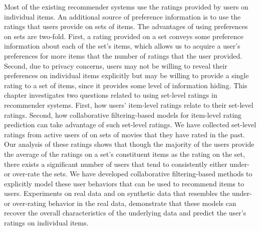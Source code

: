 Most of the existing recommender systems use the ratings provided by users on
individual items.
An additional source of preference information is to use the ratings that users provide on sets of items.
The advantages of using preferences on sets are two-fold. First, a
rating provided on a set conveys some preference information about each of the
set's items, which allows us to acquire a user's preferences for more items that
the number of ratings that the user provided.
Second, due to
privacy concerns, users may not be willing to reveal their preferences on
individual items explicitly but may be willing to provide a single rating to a
set of items, since it provides some level of information hiding. This chapter
investigates two questions related to using set-level ratings in
recommender systems. First, how users' item-level ratings relate to their
set-level ratings. Second, how collaborative filtering-based models for
item-level rating prediction can take advantage of such set-level ratings. 
We have collected set-level ratings from active users of \ML
on sets of movies that they have rated in the past. 
Our analysis of these ratings shows that though the majority of the users
provide the average of the ratings on a set's constituent items as the rating on
the set, there exists a significant number of users that tend to
consistently either under- or over-rate the sets.
We have developed collaborative filtering-based
methods to explicitly model these user behaviors that can be used to recommend
items to users. 
Experiments on real data and on synthetic data that resembles the under- or
over-rating behavior in the real data, demonstrate that these models can recover the
overall characteristics of the underlying data and predict the user's ratings on
individual items.